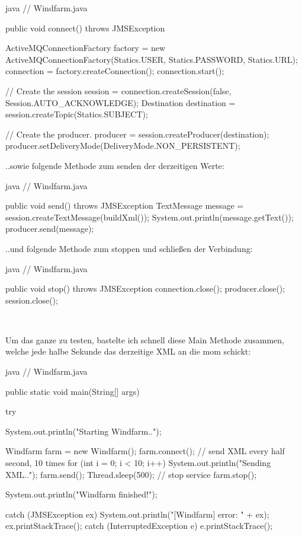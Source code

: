 \begin{code}{java}
// Windfarm.java

public void connect() throws JMSException {
    ActiveMQConnectionFactory factory = new ActiveMQConnectionFactory(Statics.USER, Statics.PASSWORD, Statics.URL);
    connection = factory.createConnection();
    connection.start();

    // Create the session
    session = connection.createSession(false, Session.AUTO_ACKNOWLEDGE);
    Destination destination = session.createTopic(Statics.SUBJECT);

    // Create the producer.
    producer = session.createProducer(destination);
    producer.setDeliveryMode(DeliveryMode.NON_PERSISTENT);
}
\end{code}

..sowie folgende Methode zum senden der derzeitigen Werte:

\begin{code}{java}
// Windfarm.java

public void send() throws JMSException {
    TextMessage message = session.createTextMessage(buildXml());
    System.out.println(message.getText());
    producer.send(message);
}
\end{code}

..und folgende Methode zum stoppen und schließen der Verbindung:

\begin{code}{java}
// Windfarm.java

public void stop() throws JMSException {
    connection.close();
    producer.close();
    session.close();
}
\end{code}

\

Um das ganze zu testen, bastelte ich schnell diese Main Methode zusammen, welche jede halbe Sekunde das derzeitige XML an die \gls{mom} schickt:

\begin{code}{java}
// Windfarm.java

public static void main(String[] args) {
    try {
        System.out.println("Starting Windfarm..");

        Windfarm farm = new Windfarm();
        farm.connect();
        // send XML every half second, 10 times
        for (int i = 0; i < 10; i++) {
            System.out.println("Sending XML..");
            farm.send();
            Thread.sleep(500);
        }
        // stop service
        farm.stop();

        System.out.println("Windfarm finished!");
    } catch (JMSException ex) {
        System.out.println("[Windfarm] error: " + ex);
        ex.printStackTrace();
    } catch (InterruptedException e) {
        e.printStackTrace();
    }
}
\end{code}

